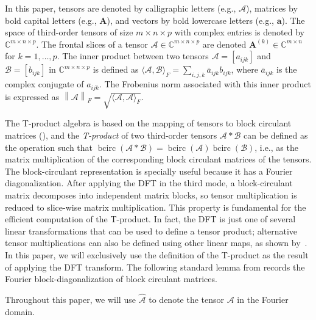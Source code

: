 \documentclass[pdflatex,sn-mathphys-ay]{sn-jnl}
\newcommand{\T}[1]{\mathcal{#1}}    %
\newcommand{\V}[1]{\bm{#1}}     %
\newcommand{\M}[1]{\bm{#1}}     %
\newcommand{\C}{\mathbb{C}}         %
\newcommand{\norm}[1]{\left\lVert#1\right\rVert_{F}} %
\newcommand{\bcirc}{\operatorname{bcirc}}
\theoremstyle{thmstyleone}
\theoremstyle{thmstyletwo}
\theoremstyle{thmstylethree}
\numberwithin{equation}{section}
\begin{document}
In this paper, tensors are denoted by calligraphic letters (e.g., $\T{A}$), matrices by bold capital letters (e.g., $\M{A}$), and vectors by bold lowercase letters (e.g., $\V{a}$). 
The space of third-order tensors of size $m \times n \times p$ with complex entries is denoted by $\C^{m\times n\times p}$. The frontal slices of a tensor $\T{A} \in \C^{m \times n \times p}$ are denoted $\M{A}^{(k)} \in \C^{m \times n}$ for $k=1, \dots, p$.
The inner product between two tensors $\T{A} = [a_{ijk}]$ and $\T{B} = [b_{ijk}]$ in $\C^{m\times n\times p}$ is defined as $\langle \T{A}, \T{B} \rangle_{F} = \sum_{i,j,k} \bar{a}_{ijk}b_{ijk}$, where $\bar{a}_{ijk}$ is the complex conjugate of $a_{ijk}$. 
The Frobenius norm associated with this inner product is expressed as $\norm{\T{A}} = \sqrt{\langle \T{A},\T{A} \rangle_{F}}$.

The T-product algebra is based on the mapping of tensors to block circulant matrices (\cite{kilmer2013third}), and the \emph{T-product} of two third-order tensors $\T{A}*\T{B}$ can be defined as the operation such that $\bcirc(\T{A}*\T{B})=\bcirc(\T{A})\bcirc(\T{B})$, i.e., as the matrix multiplication of the corresponding block circulant matrices of the tensors.
The block-circulant representation is specially useful because it has a Fourier
diagonalization. After applying the DFT in the third mode, a block-circulant matrix
decomposes into independent matrix blocks, so tensor multiplication is reduced to slice-wise matrix multiplication.
This property is fundamental for the efficient computation of the T-product. 
In fact, the DFT is just one of several linear transformations that can be used to define a tensor product;
alternative tensor multiplications can also be defined using other linear maps, as shown by~\cite{kernfeld2015tensor,keegan2025projected,ju2025computation}.
In this paper, we will exclusively use the definition of the T-product as the result of applying the DFT transform. 
The following standard lemma from \cite{kilmer2011factorization} records the Fourier block-diagonalization of block circulant matrices.

Throughout this paper, we will use $\widehat{\T{A}}$ to denote the tensor $\T{A}$ in the Fourier domain.
\end{document}

